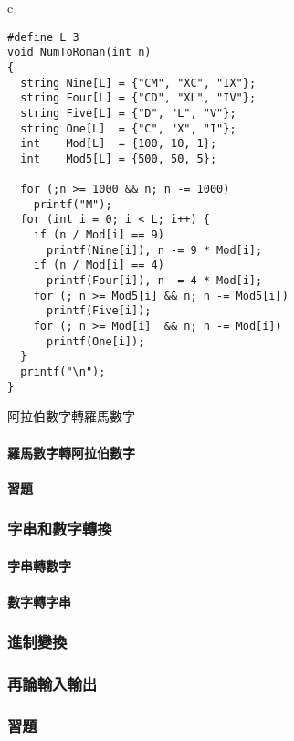 \documentclass[12pt,a4paper,oneside]{article}
\begin{document}
\begin{CJK}{UTF8}{bkai}
\begin{code}[h!]
  \centering
  \begin{tabular}{c}
  \begin{lstlisting}
#define L 3
void NumToRoman(int n)
{
  string Nine[L] = {"CM", "XC", "IX"};
  string Four[L] = {"CD", "XL", "IV"};
  string Five[L] = {"D", "L", "V"};
  string One[L]  = {"C", "X", "I"};
  int    Mod[L]  = {100, 10, 1};
  int    Mod5[L] = {500, 50, 5};

  for (;n >= 1000 && n; n -= 1000)
    printf("M");
  for (int i = 0; i < L; i++) {
    if (n / Mod[i] == 9)
      printf(Nine[i]), n -= 9 * Mod[i];
    if (n / Mod[i] == 4)
      printf(Four[i]), n -= 4 * Mod[i];
    for (; n >= Mod5[i] && n; n -= Mod5[i])
      printf(Five[i]);
    for (; n >= Mod[i]  && n; n -= Mod[i])
      printf(One[i]);
  }
  printf("\n");
}
  \end{lstlisting}
  \end{tabular}
  \caption{阿拉伯數字轉羅馬數字}
  \label{string:mani:code:number:to:roman}
\end{code}

\paragraph{羅馬數字轉阿拉伯數字}
\paragraph{習題}

\subsubsection{字串和數字轉換}
\paragraph{字串轉數字}
\paragraph{數字轉字串}
\subsubsection{進制變換}
\subsubsection{再論輸入輸出}
\subsubsection{習題}

\ifx \allfiles \undefined

\printindex

\clearpage
\end{CJK}
\end{document}
